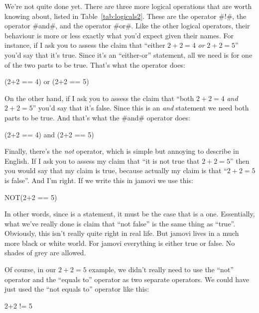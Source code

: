 We're not quite done yet. There are three more logical operations that are worth knowing about, listed in Table~\ref{tab:logicals2}. These are the  operator \rtextverb#!#, the  operator \rtextverb#and#, and the  operator \rtextverb#or#. Like the other logical operators, their behaviour is more or less exactly what you'd expect given their names. For instance, if I ask you to assess the claim that ``either $2+2 = 4$ {\it or} $2+2 = 5$'' you'd say that it's true. Since it's an ``either-or'' statement, all we need is for one of the two parts to be true. That's what the  operator does: 
\begin{rblock1}
(2+2 == 4) or (2+2 == 5) 
\end{rblock1}
On the other hand, if I ask you to assess the claim that ``both $2+2 = 4$ {\it and} $2+2 = 5$'' you'd say that it's false. Since this is an {\it and} statement we need both parts to be true. And that's what the \rtextverb#and# operator does:
\begin{rblock1}
(2+2 == 4) and (2+2 == 5)
\end{rblock1}
Finally, there's the {\it not} operator, which is simple but annoying to describe in English. If I ask you to assess my claim that ``it is not true that $2+2 = 5$'' then you would say that my claim is true,  because actually my claim is that ``$2+2 = 5$ is false''. And I'm right. If we write this in jamovi we use this: 
\begin{rblock1}
NOT(2+2 == 5)
\end{rblock1}
In other words, since  is a  statement, it must be the case that  is a  one. Essentially, what we've really done is claim that ``not false'' is the same thing as ``true''. Obviously, this isn't really quite right in real life. But jamovi lives in a much more black or white world. For jamovi everything is either true or false. No shades of grey are allowed. 

Of course, in our $2+2 = 5$ example, we didn't really need to use the ``not'' operator  and the ``equals to'' operator \rtext{==} as two separate operators. We could have just used the ``not equals to'' operator \rtext{!=} like this:
\begin{rblock1}
{2+2 != 5}
\end{rblock1}

